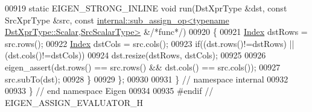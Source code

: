 \begin{DoxyCode}
00919   \textcolor{keyword}{static} EIGEN\_STRONG\_INLINE \textcolor{keywordtype}{void} run(DstXprType &dst, \textcolor{keyword}{const} SrcXprType &src, \textcolor{keyword}{const} 
      \hyperlink{struct_eigen_1_1internal_1_1sub__assign__op}{internal::sub\_assign\_op<typename DstXprType::Scalar,SrcScalarType>}
       &\textcolor{comment}{/*func*/})
00920   \{
00921     \hyperlink{namespace_eigen_a62e77e0933482dafde8fe197d9a2cfde}{Index} dstRows = src.rows();
00922     \hyperlink{namespace_eigen_a62e77e0933482dafde8fe197d9a2cfde}{Index} dstCols = src.cols();
00923     \textcolor{keywordflow}{if}((dst.rows()!=dstRows) || (dst.cols()!=dstCols))
00924       dst.resize(dstRows, dstCols);
00925 
00926     eigen\_assert(dst.rows() == src.rows() && dst.cols() == src.cols());
00927     src.subTo(dst);
00928   \}
00929 \};
00930 
00931 \} \textcolor{comment}{// namespace internal}
00932 
00933 \} \textcolor{comment}{// end namespace Eigen}
00934 
00935 \textcolor{preprocessor}{#endif // EIGEN\_ASSIGN\_EVALUATOR\_H}
\end{DoxyCode}
